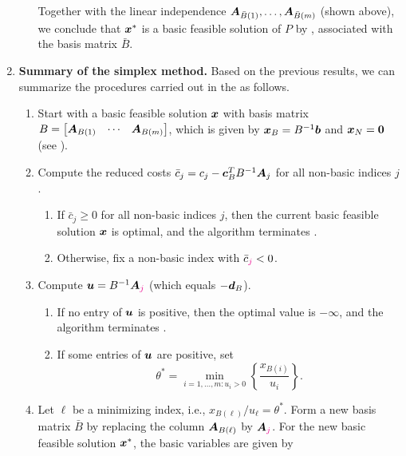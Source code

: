 \begin{enumerate}
\begin{pf}
\begin{enumerate}
Together with the linear independence
\(\bm{A}_{\bar{B}(1)},\dotsc,\bm{A}_{\bar{B}(m)}\) (shown above), we
conclude that \(\bm{x}^*\) is a basic feasible solution of \(P\) by
, associated with the basis matrix \(\bar{B}\).
\end{enumerate}
\end{pf}
\item \label{it:simplex-method-algo} \textbf{Summary of the simplex method.}
Based on the previous results, we can summarize the procedures carried out in
the  as follows.
\begin{enumerate}[label={(\arabic*)}]
\item Start with a basic feasible solution \(\bm{x}\) with basis matrix \(B=\begin{bmatrix}
\bm{A}_{B(1)}&\cdots&\bm{A}_{B(m)}\end{bmatrix}\), which is given by
\(\bm{x}_{B}=B^{-1}\bm{b}\) and \(\bm{x}_N=\bm{0}\) (see
).
\item Compute the reduced costs
\(\bar{c}_j=c_j-\bm{c}_{B}^{T}B^{-1}\bm{A}_j\) for all non-basic indices
\(j\).
\begin{enumerate}
\item If \(\bar{c}_j\ge 0\) for all non-basic indices \(j\), then the current
basic feasible solution \(\bm{x}\) is optimal, and the algorithm terminates
.
\item Otherwise, fix a non-basic index  with \(\bar{c}_{\color{magenta}j}<0\).
\end{enumerate}
\item Compute \(\bm{u}=B^{-1}\bm{A}_{{\color{magenta}j}}\) (which equals
\(-\bm{d}_{B}\)).
\begin{enumerate}
\item If no entry of \(\bm{u}\) is positive, then the optimal value is
\(-\infty\), and the algorithm terminates .
\item If some entries of \(\bm{u}\) are positive, set
\[
\theta^{*}=\min_{i=1,\dotsc,m:u_i>0}\left\{\frac{x_{B(i)}}{u_i}\right\}.
\]
\end{enumerate}
\item Let \(\ell\) be a minimizing index, i.e.,
\(x_{B(\ell)}/u_{\ell}=\theta^{*}\). Form a new basis matrix \(\bar{B}\) by
replacing the column \(\bm{A}_{B(\ell)}\) by \(\bm{A}_{\color{magenta}j}\). For the new
basic feasible solution \(\bm{x}^*\), the basic variables are given by

\end{enumerate}
\end{enumerate}
